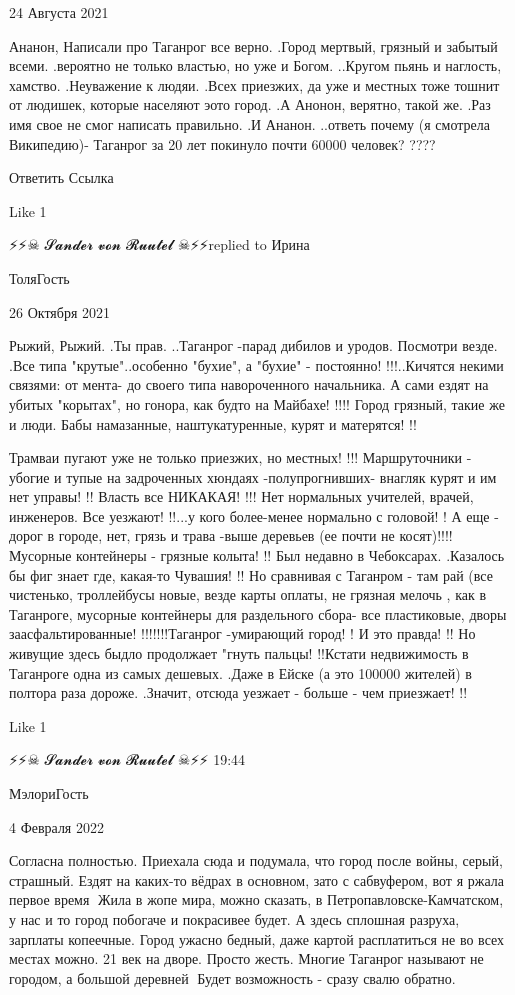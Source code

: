 24 Августа 2021

Ананон, Написали про Таганрог все верно. .Город мертвый, грязный и забытый
всеми. .вероятно не только властью, но уже и Богом. ..Кругом пьянь и наглость,
хамство. .Неуважение к людяи. .Всех приезжих, да уже и местных тоже тошнит от
людишек, которые населяют эото город. .А Анонон, верятно, такой же. .Раз имя
свое не смог написать правильно. .И Ананон. ..ответь почему (я смотрела
Википедию)- Таганрог за 20 лет покинуло почти 60000 человек? ????

 Ответить Ссылка

    Like 1

⚡⚡☠ 𝓢𝓪𝓷𝓭𝓮𝓻 𝓿𝓸𝓷 𝓡𝓾𝓾𝓽𝓮𝓵 ☠⚡⚡replied to Ирина

ТоляГость

26 Октября 2021

Рыжий, Рыжий. .Ты прав. ..Таганрог -парад дибилов и уродов. Посмотри везде.
.Все типа "крутые"..особенно "бухие", а "бухие" - постоянно! !!!..Кичятся
некими связями: от мента- до своего типа навороченного начальника. А сами ездят
на убитых "корытах", но гонора, как будто на Майбахе! !!!! Город грязный, такие
же и люди. Бабы намазанные, наштукатуренные, курят и матерятся! !!

Трамваи пугают уже не только приезжих, но местных! !!! Маршруточники - убогие и
тупые на задроченных хюндаях -полупрогнивших- внагляк курят и им нет управы! !!
Власть все НИКАКАЯ! !!! Нет нормальных учителей, врачей, инженеров. Все
уезжают! !!...у кого более-менее нормально с головой! ! А еще - дорог в городе,
нет, грязь и трава -выше деревьев (ее почти не косят)!!!! Мусорные контейнеры -
грязные колыта! !! Был недавно в Чебоксарах. .Казалось бы фиг знает где,
какая-то Чувашия! !! Но сравнивая с Таганром - там рай (все чистенько,
троллейбусы новые, везде карты оплаты, не грязная мелочь , как в Таганроге,
мусорные контейнеры для раздельного сбора- все пластиковые, дворы
заасфальтированные! !!!!!!!Таганрог -умирающий город! ! И это правда! !! Но
живущие здесь быдло продолжает "гнуть пальцы! !!Кстати недвижимость в Таганроге
одна из самых дешевых. .Даже в Ейске (а это 100000 жителей) в полтора раза
дороже. .Значит, отсюда уезжает - больше - чем приезжает! !!

    Like 1

⚡⚡☠ 𝓢𝓪𝓷𝓭𝓮𝓻 𝓿𝓸𝓷 𝓡𝓾𝓾𝓽𝓮𝓵 ☠⚡⚡
19:44

МэлориГость

4 Февраля 2022

Согласна полностью. Приехала сюда и подумала, что город после войны, серый,
страшный. Ездят на каких-то вёдрах в основном, зато с сабвуфером, вот я ржала
первое время🤣 Жила в жопе мира, можно сказать, в Петропавловске-Камчатском, у
нас и то город побогаче и покрасивее будет. А здесь сплошная разруха, зарплаты
копеечные. Город ужасно бедный, даже картой расплатиться не во всех местах
можно. 21 век на дворе. Просто жесть. Многие Таганрог называют не городом, а
большой деревней🤣 Будет возможность - сразу свалю обратно.

